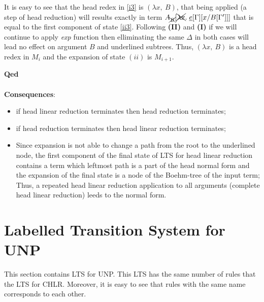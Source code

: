 \documentclass[a4paper, 10pt]{article}
\begin{document}
It is easy to see that the head redex in \eqref{i3} is $(\lambda x,\ B)$, that being applied (a step of head reduction) will results exactly in term $A_{\xcancel{B}}[\xcancel{\lambda x}.\; \underline{e}[\Gamma][x/B[\Gamma']]]$ that is equal to the first component of state \eqref{ii3}. Following \textbf{(II)} and \textbf{(I)} if we will continue to apply \emph{exp} function then elliminating the same $\Delta$ in both cases will lead no effect on argument $B$ and underlined subtrees. Thus, $(\lambda x,\ B)$ is a head redex in $M_i$ and the expansion of state $(ii)$ is $M_{i+1}$.

\textbf{Qed} \\ \\ 

\textbf{Consequences}:
\begin{itemize}
\item if head linear reduction terminates then head reduction terminates;
\item if head reduction terminates then head linear reduction terminates;
\item Since expansion is not able to change a path from the root to the underlined node,
  the first component of the final state of LTS for head linear reduction
  contains a term which leftmost path is a part of the head normal form 
  and the expansion of the final state is a node of the Boehm-tree of the input term; \\
  Thus, a repeated head linear reduction application to all arguments
  (complete head linear reduction) leeds to the normal form.
\end{itemize}



\section{Labelled Transition System for UNP}
This section contains LTS for UNP. This LTS has the same number of rules that the LTS for CHLR.
Moreover, it is easy to see that rules with the same name corresponds to each other. \\ \\
\end{document}
